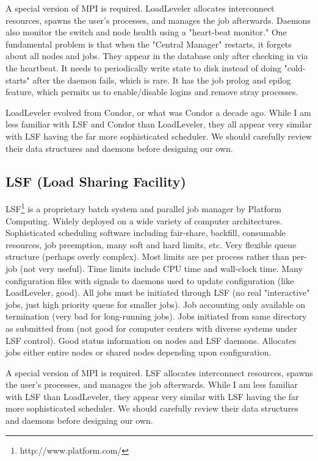 A special version of MPI is required. LoadLeveler allocates 
interconnect resources, spawns the user's processes, and manages the 
job afterwards. Daemons also monitor the switch and node health using 
a "heart-beat monitor." One fundamental problem is that when the 
"Central Manager" restarts, it forgets about all nodes and jobs. They 
appear in the database only after checking in via the heartbeat. It 
needs to periodically write state to disk instead of doing 
"cold-starts" after the daemon fails, which is rare. It has the job 
prolog and epilog feature, which permits us to enable/disable logins 
and remove stray processes.

LoadLeveler evolved from Condor, or what was Condor a decade ago. 
While I am less familiar with LSF and Condor than LoadLeveler, they 
all appear very similar with LSF having the far more sophisticated 
scheduler. We should carefully review their data structures and 
daemons before designing our own.

\subsection{LSF (Load Sharing Facility)}


LSF\footnote{http://www.platform.com/}
 is a proprietary batch system and parallel job manager by 
Platform Computing. Widely deployed on a wide variety of computer 
architectures. Sophisticated scheduling software including 
fair-share, backfill, consumable resources, job preemption, many soft 
and hard limits, etc. Very flexible queue structure (perhaps overly 
complex). Most limits are per process rather than per-job (not very 
useful). Time limits include CPU time and wall-clock time. Many 
configuration files with signals to daemons used to update 
configuration (like LoadLeveler, good). All jobs must be initiated 
through LSF (no real "interactive" jobs, just high priority queue for 
smaller jobs). Job accounting only available on termination (very bad 
for long-running jobs). Jobs initiated from same directory as 
submitted from (not good for computer centers with diverse systems 
under LSF control). Good status information on nodes and LSF daemons. 
Allocates jobs either entire nodes or shared nodes depending upon 
configuration.

A special version of MPI is required. LSF allocates interconnect 
resources, spawns the user's processes, and manages the job 
afterwards. While I am less familiar with LSF than LoadLeveler, they 
appear very similar with LSF having the far more sophisticated 
scheduler. We should carefully review their data structures and 
daemons before designing our own.


